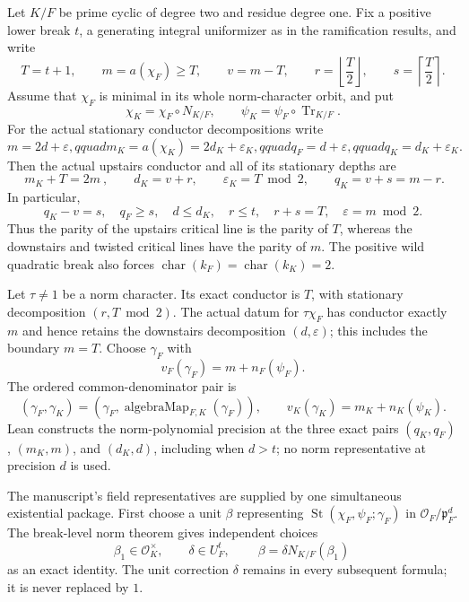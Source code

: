 \begin{theorem}
\label{mod:parameters-highquadratic}
Let $K/F$ be prime cyclic of degree two and residue degree one.  Fix a
positive lower break $t$, a generating integral uniformizer as in the
ramification results, and write
\[
 T=t+1,\qquad m=a(\chi_F)\geq T,\qquad v=m-T,
 \qquad r=\left\lfloor\frac T2\right\rfloor,
 \qquad s=\left\lceil\frac T2\right\rceil.
\]
Assume that $\chi_F$ is minimal in its whole norm-character orbit, and put
\[
 \chi_K=\chi_F\circ N_{K/F},\qquad
 \psi_K=\psi_F\circ\operatorname{Tr}_{K/F}.
\]
For the actual stationary conductor decompositions write
\[
 m=2d+\varepsilon,qquad
 m_K=a(\chi_K)=2d_K+\varepsilon_K,qquad
 q_F=d+\varepsilon,qquad q_K=d_K+\varepsilon_K.
\]
Then the actual upstairs conductor and all of its stationary depths are
\[
 \boxed{\ m_K+T=2m\ },\qquad
 d_K=v+r,\qquad \varepsilon_K=T\bmod 2,
 \qquad q_K=v+s=m-r.
\]
In particular,
\[
 q_K-v=s,\quad q_F\geq s,\quad d\leq d_K,\quad
 r\leq t,\quad r+s=T,\quad
 \varepsilon=m\bmod2.
\]
Thus the parity of the upstairs critical line is the parity of $T$, whereas
the downstairs and twisted critical lines have the parity of $m$.
The positive wild quadratic break also forces
\(\operatorname{char}(k_F)=\operatorname{char}(k_K)=2\).

Let $\tau\ne1$ be a norm character.  Its exact conductor is $T$, with
stationary decomposition $(r,T\bmod2)$.  The actual datum for
$\tau\chi_F$ has conductor exactly $m$ and hence retains the downstairs
decomposition $(d,\varepsilon)$; this includes the boundary $m=T$.
Choose $\gamma_F$ with
\[
 v_F(\gamma_F)=m+n_F(\psi_F).
\]
The ordered common-denominator pair is
\[
 (\gamma_F,\gamma_K)=
 (\gamma_F,\operatorname{algebraMap}_{F,K}(\gamma_F)),
 \qquad
 v_K(\gamma_K)=m_K+n_K(\psi_K).
\]
Lean constructs the norm-polynomial precision at the three exact pairs
$(q_K,q_F)$, $(m_K,m)$, and $(d_K,d)$, including when $d>t$; no norm
representative at precision $d$ is used.

The manuscript's field representatives are supplied by one simultaneous
existential package.  First choose a unit $\beta$ representing
\(\operatorname{St}(\chi_F,\psi_F;\gamma_F)\) in
\(\mathcal O_F/\mathfrak p_F^d\).  The break-level norm theorem gives
independent choices
\[
 \beta_1\in\mathcal O_K^\times,
 \qquad \delta\in U_F^t,
 \qquad \boxed{\ \beta=\delta N_{K/F}(\beta_1)\ }
\]
as an exact identity.  The unit correction $\delta$ remains in every
subsequent formula; it is never replaced by $1$.


\end{theorem}
